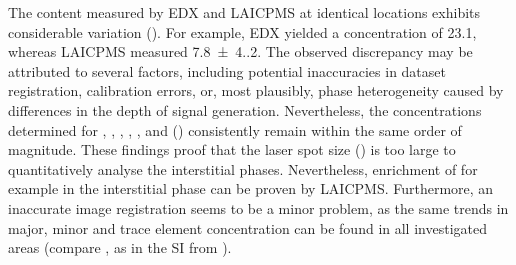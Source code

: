The  content measured by \ac{EDX} and \ac{LAICPMS} at identical locations exhibits considerable variation ().
For example, \ac{EDX} yielded a concentration of \qty{23.1}{\wtpercent}, whereas \ac{LAICPMS} measured \qty{7.8(4.2)}{\wtpercent}.
The observed discrepancy may be attributed to several factors, including potential inaccuracies in dataset registration, calibration errors, or, most plausibly, phase heterogeneity caused by differences in the depth of signal generation.
Nevertheless, the concentrations determined for , , , , , and  () consistently remain within the same order of magnitude.
These findings proof that the laser spot size () is too large to quantitatively analyse the interstitial phases.
Nevertheless, enrichment of for example  in the interstitial phase can be proven by \ac{LAICPMS}.
Furthermore, an inaccurate image registration seems to be a minor problem, as the same trends in major, minor and trace element concentration can be found in all investigated areas (compare , as in the \ac{SI} from \cite{kleiner.2022b}).

